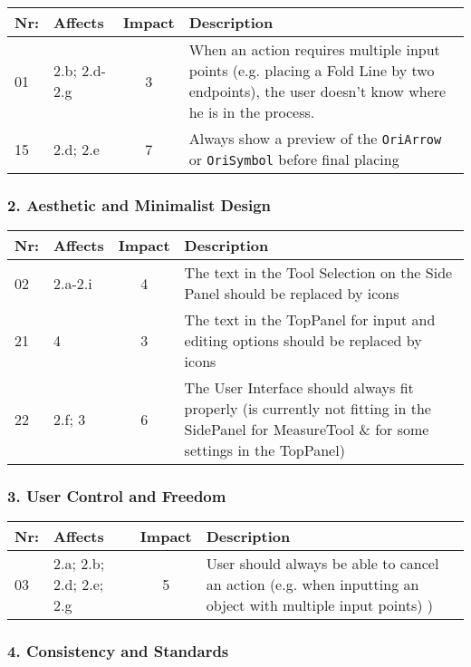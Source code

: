         \begin{tabular}{l | p{} | c | p{}}
        Nr: & Affects & Impact & Description \\ \hline
        01 & 2.b; 2.d-2.g & 3 & When an action requires multiple input points (e.g. placing a Fold Line by two endpoints), the user doesn't know where he is in the process. \\ \hline %
        15 & 2.d; 2.e & 7 & Always show a preview of the \texttt{OriArrow} or \texttt{OriSymbol} before final placing\\ \hline
        \end{tabular}



\subsubsection*{2. Aesthetic and Minimalist Design}
        \begin{tabular}{l | p{} | c | p{}}
        Nr: & Affects & Impact & Description \\ \hline
        02 & 2.a-2.i  & 4 &  The text in the Tool Selection on the Side Panel should be replaced by icons\\ \hline 
	21 & 4 & 3 & The text in the TopPanel for input and editing options should be replaced by icons\\ \hline
	22 & 2.f; 3 & 6 & The User Interface should always fit properly (is currently not fitting in the SidePanel for MeasureTool \& for some settings in the TopPanel)\\ \hline
        \end{tabular}

\subsubsection*{3. User Control and Freedom}

        \begin{tabular}{l | p{} | c | p{}}
        Nr: & Affects & Impact & Description \\ \hline
        03 & 2.a; 2.b; 2.d; 2.e; 2.g  & 5 & User should always be able to cancel an action (e.g. when inputting an object with multiple input points) )\\ \hline 
        \end{tabular}


\subsubsection*{4. Consistency and Standards}

